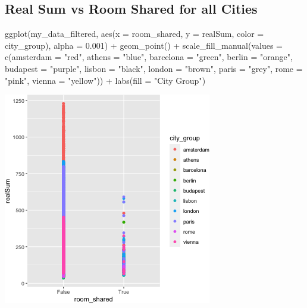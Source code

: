 \documentclass[
]{article}
\newenvironment{Shaded}{\begin{snugshade}}{\end{snugshade}}
\newcommand{\AttributeTok}[1]{\textcolor[rgb]{0.77,0.63,0.00}{#1}}
\newcommand{\FloatTok}[1]{\textcolor[rgb]{0.00,0.00,0.81}{#1}}
\newcommand{\FunctionTok}[1]{\textcolor[rgb]{0.00,0.00,0.00}{#1}}
\newcommand{\NormalTok}[1]{#1}
\newcommand{\SpecialCharTok}[1]{\textcolor[rgb]{0.00,0.00,0.00}{#1}}
\newcommand{\StringTok}[1]{\textcolor[rgb]{0.31,0.60,0.02}{#1}}
\begin{document}
\hypertarget{real-sum-vs-room-shared-for-all-cities}{%
\subsection{Real Sum vs Room Shared for all
Cities}\label{real-sum-vs-room-shared-for-all-cities}}

\begin{Shaded}
\begin{Highlighting}[]
\FunctionTok{ggplot}\NormalTok{(my\_data\_filtered, }\FunctionTok{aes}\NormalTok{(}\AttributeTok{x =}\NormalTok{ room\_shared, }\AttributeTok{y =}\NormalTok{ realSum, }\AttributeTok{color =}\NormalTok{ city\_group),}
    \AttributeTok{alpha =} \FloatTok{0.001}\NormalTok{) }\SpecialCharTok{+} \FunctionTok{geom\_point}\NormalTok{() }\SpecialCharTok{+} \FunctionTok{scale\_fill\_manual}\NormalTok{(}\AttributeTok{values =} \FunctionTok{c}\NormalTok{(}\AttributeTok{amsterdam =} \StringTok{"red"}\NormalTok{,}
    \AttributeTok{athens =} \StringTok{"blue"}\NormalTok{, }\AttributeTok{barcelona =} \StringTok{"green"}\NormalTok{, }\AttributeTok{berlin =} \StringTok{"orange"}\NormalTok{,}
    \AttributeTok{budapest =} \StringTok{"purple"}\NormalTok{, }\AttributeTok{lisbon =} \StringTok{"black"}\NormalTok{, }\AttributeTok{london =} \StringTok{"brown"}\NormalTok{,}
    \AttributeTok{paris =} \StringTok{"grey"}\NormalTok{, }\AttributeTok{rome =} \StringTok{"pink"}\NormalTok{, }\AttributeTok{vienna =} \StringTok{"yellow"}\NormalTok{)) }\SpecialCharTok{+} \FunctionTok{labs}\NormalTok{(}\AttributeTok{fill =} \StringTok{"City Group"}\NormalTok{)}
\end{Highlighting}
\end{Shaded}

\includegraphics{Project_files/figure-latex/unnamed-chunk-32-1.png}
\end{document}
